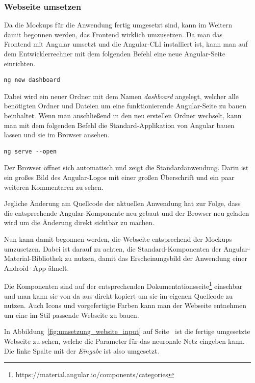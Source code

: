 \subsubsection{Webseite umsetzen}
Da die Mockups für die Anwendung fertig umgesetzt sind, kann im Weitern damit begonnen werden, das Frontend wirklich
umzusetzen. Da man das Frontend mit Angular umsetzt und die Angular-CLI installiert ist, kann man auf dem
Entwicklerrechner mit dem folgenden Befehl eine neue Angular-Seite einrichten.

\begin{lstlisting}[caption=Einrichten einer neuen Angular-Seite, label=ls:umsetzung_angular]
    ng new dashboard
\end{lstlisting}

Dabei wird ein neuer Ordner mit dem Namen \textit{dashboard} angelegt, welcher alle benötigten Ordner und Dateien um
eine funktionierende Angular-Seite zu bauen beinhaltet. Wenn man anschließend in den neu erstellen Ordner wechselt, kann
man mit dem folgenden Befehl die Standard-Applikation von Angular bauen lassen und sie im Browser ansehen.

\begin{lstlisting}[caption=Bereitstellen der Angular-Webseite, label=ls:umsetzung_angularserve]
    ng serve --open
\end{lstlisting}

Der Browser öffnet sich automatisch und zeigt die Standardanwendung. Darin ist ein großes Bild des Angular-Logos mit
einer großen Überschrift und ein paar weiteren Kommentaren zu sehen.

Jegliche Änderung am Quellcode der aktuellen Anwendung hat zur Folge, dass die entsprechende Angular-Komponente neu
gebaut und der Browser neu geladen wird um die Änderung direkt sichtbar zu machen.

Nun kann damit begonnen werden, die Webseite entsprechend der Mockups umzusetzen. Dabei ist darauf zu achten, die
Standard-Komponenten der Angular-Material-Bibliothek zu nutzen, damit das Erscheinungsbild der Anwendung einer Android-
App ähnelt.

Die Komponenten sind auf der entsprechenden Dokumentationsseite\footnote{https://material.angular.io/components/categories}
einsehbar und man kann sie von da aus direkt kopiert um sie im eigenen Quellcode zu nutzen. Auch Icons und vorgefertigte
Farben kann man der Webseite entnehmen um eine im Stil passende Webseite zu bauen.

In Abbildung~\ref{fig:umsetzung_website_input} auf Seite~\pageref{fig:umsetzung_website_input} ist die fertige
umgesetzte Webseite zu sehen, welche die Parameter für das neuronale Netz eingeben kann. Die linke Spalte mit der
\textit{Eingabe} ist also umgesetzt.

